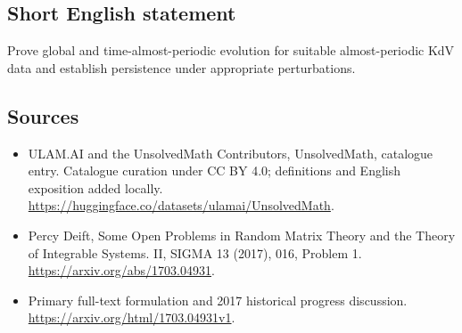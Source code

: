 \documentclass[11pt]{article}
\begin{document}
\subsection{Short English statement}
Prove global and time-almost-periodic evolution for suitable almost-periodic KdV data and establish persistence under appropriate perturbations.
\subsection{Sources}
\begin{itemize}
\item[\hypertarget{source:statement:1}{S1}] ULAM.AI and the UnsolvedMath Contributors, UnsolvedMath, catalogue entry. Catalogue curation under CC BY 4.0; definitions and English exposition added locally.
\url{https://huggingface.co/datasets/ulamai/UnsolvedMath}.
\item[\hypertarget{source:statement:2}{S2}] Percy Deift, Some Open Problems in Random Matrix Theory and the Theory of Integrable Systems. II, SIGMA 13 (2017), 016, Problem 1.
\url{https://arxiv.org/abs/1703.04931}.
\item[\hypertarget{source:statement:3}{S3}] Primary full-text formulation and 2017 historical progress discussion.
\url{https://arxiv.org/html/1703.04931v1}.
\end{itemize}
\label{end:statement}
\end{document}
